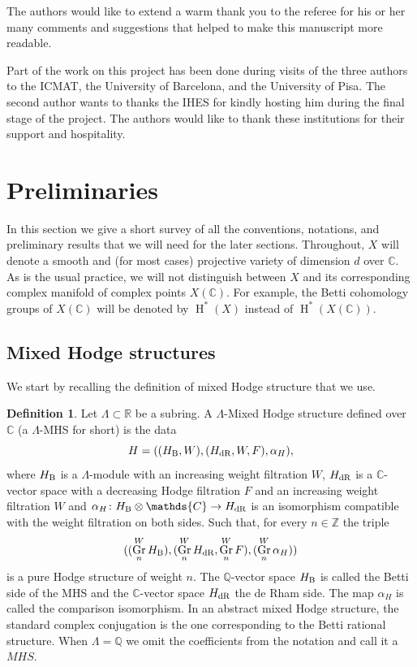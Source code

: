 \documentclass[11pt,a4paper]{amsart}
\newcommand{\Betti}{\text{\rm B}}
\newcommand{\dR}{\text{\rm dR}}
\newcommand{\C}{\mathds{C}}
\newcommand{\Q}{\mathds{Q}}
\newcommand{\R}{\mathds{R}}
\newcommand{\Z}{\mathds{Z}}
\DeclareMathOperator {\Gr} {Gr}
\DeclareMathOperator{\rH}{H}
\numberwithin{equation}{section}
\theoremstyle{plain}
\theoremstyle{definition}
\newtheorem{df}[prop]{Definition}
\begin{document}
The authors would like to extend a warm thank you to the referee for
his or her many comments and suggestions that helped to make this
manuscript more readable. 

Part of the work on this project has been done during visits  of the three
authors to the ICMAT, the University of Barcelona, and the University
of Pisa. The second author wants to thanks the IHES for kindly hosting
him during the final stage of the project.  
The authors would like to
thank these institutions for their support and hospitality. 


\section{Preliminaries}\label{preliminaries}
In this section we give a short survey of all the conventions, notations,
and preliminary results that we will need for the later
sections. Throughout, $X$ will denote a smooth and (for most cases)
projective variety of dimension $d$ over $\C$. As is the usual
practice, we will not distinguish between $X$ and its corresponding
complex manifold of complex points $X(\C)$. For example, the Betti
cohomology groups of $X(\C)$ will be denoted by $\rH^{\ast}(X)$
instead of $\rH^{\ast}(X(\C))$.
\subsection{Mixed Hodge structures}
We start by recalling the definition of mixed Hodge structure that we
use.
\begin{df}\label{def:8} Let $\Lambda \subset \R$ be a subring. A
  $\Lambda $-Mixed Hodge structure defined over 
  $\C$ (a $\Lambda $-MHS for short) is the data
  \begin{displaymath}
    H=((H_{\Betti},W),(H_{\dR},W,F),\alpha_{H}),
  \end{displaymath}
  where $H_{\Betti}$ is a $\Lambda $-module with an increasing
  weight filtration $W$, $H_{\dR}$ is a $\C$-vector space with a decreasing
  Hodge filtration $F$ and an increasing weight filtration $W$ and
  $\alpha_{H} \colon H_{\Betti}\otimes \C\to H_{\dR}$ is an isomorphism
  compatible with the weight filtration on both sides. Such that, for
  every $n\in \Z$ the triple
  \begin{displaymath}
    ((\Gr_{n}^{W}H_{\Betti}),(\Gr_{n}^{W}H_{\dR},\Gr_{n}^{W}F),(\Gr_{n}^{W}\alpha_{H}
    ))
  \end{displaymath}
  is a pure Hodge structure of weight $n$. The $\Q$-vector space
  $H_{\Betti}$ is called the Betti side of the MHS and the $\C$-vector
  space $H_{\dR}$ the de Rham side. The map $\alpha_{H} $ is called the
  comparison isomorphism. In an abstract mixed Hodge structure, the
  standard complex conjugation is the one corresponding to the Betti
  rational structure. When $\Lambda =\Q$ we omit the coefficients from the notation
  and call it a $MHS$.  
\end{df}
\end{document}
